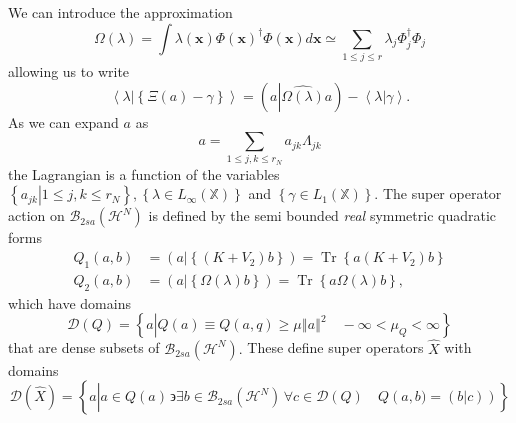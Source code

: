 \documentclass[aps,preprint]{revtex4}%
\begin{document}
We can introduce the approximation
\begin{equation}
\Omega\left(  \lambda\right)  =\int\lambda\left(  \mathbf{x}\right)
\Phi\left(  \mathbf{x}\right)  ^{\dagger}\Phi\left(  \mathbf{x}\right)
d\mathbf{x\simeq}\sum_{1\leq j\leq r}\lambda_{j}\Phi_{j}^{\dagger}\Phi_{j}%
\end{equation}
allowing us to write
\begin{equation}
\left\langle \lambda\left\vert \left\{  \Xi\left(  a\right)  -\gamma\right\}
\right.  \right\rangle =\left(  a\left\vert \widehat{\Omega\left(
\lambda\right)  }\right.  a\right)  -\left\langle \lambda\left\vert \overset
{}{\gamma}\right.  \right\rangle .
\end{equation}
As we can expand $a$ as
\begin{equation}
a=\sum_{1\leq j,k\leq r_{N}}a_{jk}\Lambda_{jk}%
\end{equation}
the Lagrangian is a function of the variables $\left\{  \left.  a_{jk}%
\right\vert 1\leq j,k\leq r_{N}\right\}  ,\left\{  \lambda\in L_{\infty
}\left(  \mathbb{X}\right)  \right\}  $ and $\left\{  \gamma\in L_{1}\left(
\mathbb{X}\right)  \right\}  .$ The super operator action on $\mathcal{B}%
_{2sa}\left(  \mathcal{H}^{N}\right)  $ is defined by the semi bounded
\emph{real }symmetric quadratic forms
\begin{align}
Q_{1}\left(  a,b\right)   &  =\left(  a\left\vert \left\{  \left(
K+V_{2}\right)  b\right\}  \right.  \right)  =\operatorname{Tr}\left\{
a\left(  K+V_{2}\right)  b\right\} \nonumber\\
Q_{2}\left(  a,b\right)   &  =\left(  a\left\vert \left\{  \Omega\left(
\lambda\right)  b\right\}  \right.  \right)  =\operatorname{Tr}\left\{
a\Omega\left(  \lambda\right)  b\right\}  ,
\end{align}
which have domains
\begin{equation}
\mathcal{D}\left(  Q\right)  =\left\{  a\left\vert Q\left(  a\right)  \equiv
Q\left(  a,q\right)  \geq\mu\left\Vert a\right\Vert ^{2}\right.  \quad
-\infty<\mu_{Q}<\infty\right\}
\end{equation}
that are dense subsets of $\mathcal{B}_{2sa}\left(  \mathcal{H}^{N}\right)  .$
These define super operators $\widehat{X}$ with domains
\begin{equation}
\mathcal{D}\left(  \widehat{X}\right)  =\left\{  a\left\vert \overset{}{a\in
Q\left(  a\right)  \,\backepsilon\exists b\in\mathcal{B}_{2sa}\left(
\mathcal{H}^{N}\right)  \,\forall c\in\mathcal{D}\left(  Q\right)  \quad
Q\left(  a,b)=\left(  \left.  b\right\vert c\right)  \right)  }\right.
\right\}
\end{equation}
\end{document}
